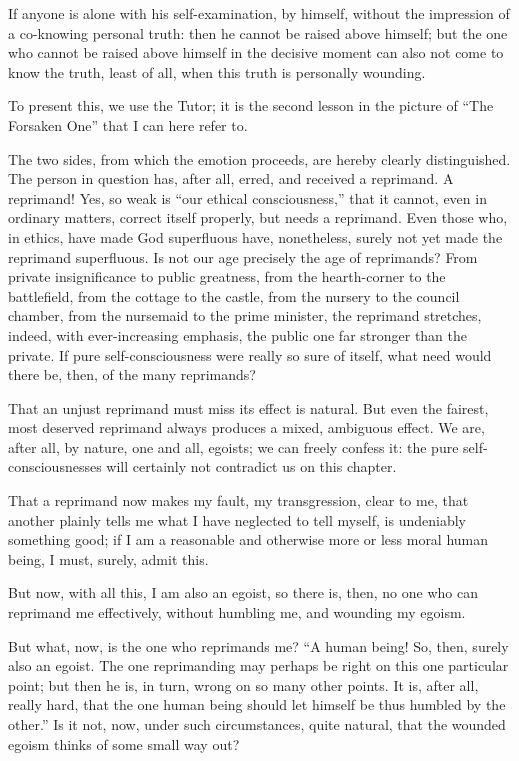 \documentclass[12pt,a4paper]{book}
\begin{document}
If anyone is alone with his self-examination, by himself, without the impression of a co-knowing personal truth: then he cannot be raised above himself; but the one who cannot be raised above himself in the decisive moment can also not come to know the truth, least of all, when this truth is personally wounding.

To present this, we use the Tutor; it is the second lesson in the picture of ``The Forsaken One'' that I can here refer to.

The two sides, from which the emotion proceeds, are hereby clearly distinguished. The person in question has, after all, erred, and received a reprimand. A reprimand! Yes, so weak is ``our ethical consciousness,'' that it cannot, even in ordinary matters, correct itself properly, but needs a reprimand. Even those who, in ethics, have made God superfluous have, nonetheless, surely not yet made the reprimand superfluous.
Is not our age precisely the age of reprimands? From private insignificance to public greatness, from the hearth-corner to the battlefield, from the cottage to the castle, from the nursery to the council chamber, from the nursemaid to the prime minister, the reprimand stretches, indeed, with ever-increasing emphasis, the public one far stronger than the private. If pure self-consciousness were really so sure of itself, what need would there be, then, of the many reprimands?

That an unjust reprimand must miss its effect is natural. But even the fairest, most deserved reprimand always produces a mixed, ambiguous effect. We are, after all, by nature, one and all, egoists; we can freely confess it: the pure self-consciousnesses will certainly not contradict us on this chapter.

That a reprimand now makes my fault, my transgression, clear to me, that another plainly tells me what I have neglected to tell myself, is undeniably something good; if I am a reasonable and otherwise more or less moral human being, I must, surely, admit this.

But now, with all this, I am also an egoist, so there is, then, no one who can reprimand me effectively, without humbling me, and wounding my egoism.

But what, now, is the one who reprimands me? ``A human being! So, then, surely also an egoist. The one reprimanding may perhaps be right on this one particular point; but then he is, in turn, wrong on so many other points. It is, after all, really hard, that the one human being should let himself be thus humbled by the other.'' Is it not, now, under such circumstances, quite natural, that the wounded egoism thinks of some small way out?
\end{document}
